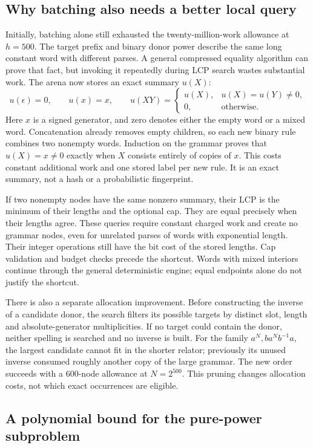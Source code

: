 \subsection{Why batching also needs a better local query}

Initially, batching alone still exhausted the twenty-million-work allowance
at $h=500$. The target prefix and binary donor power describe the same
long constant word with different parses. A general compressed equality
algorithm can prove that fact, but invoking it repeatedly during LCP search
wastes substantial work. The arena now stores an exact summary $u(X)$:
\[
 u(\epsilon)=0,\qquad u(x)=x,\qquad
 u(XY)=\begin{cases}
 u(X),&u(X)=u(Y)\ne0,\\
 0,&\text{otherwise}.
 \end{cases}
\]
Here $x$ is a signed generator, and zero denotes either the empty word or
a mixed word. Concatenation already removes empty children, so each new
binary rule combines two nonempty words. Induction on the grammar proves
that $u(X)=x\ne0$ exactly when $X$ consists entirely of copies of $x$.
This costs constant additional work and one stored label per new rule.
It is an exact summary, not a hash or a probabilistic fingerprint.

If two nonempty nodes have the same nonzero summary, their LCP is the
minimum of their lengths and the optional cap. They are equal precisely
when their lengths agree. These queries require constant charged work
and create no grammar nodes, even for unrelated parses of words with
exponential length. Their integer operations still have the bit cost of
the stored lengths. Cap validation and budget checks precede the shortcut.
Words with mixed interiors continue through the general deterministic
engine; equal endpoints alone do not justify the shortcut.

There is also a separate allocation improvement. Before constructing the
inverse of a candidate donor, the search filters its possible targets by
distinct slot, length and absolute-generator multiplicities. If no target
could contain the donor, neither spelling is searched and no inverse is
built. For the family $a^N,ba^Nb^{-1}a$, the largest candidate cannot fit
in the shorter relator; previously its unused inverse consumed roughly
another copy of the large grammar. The new order succeeds with a
600-node allowance at $N=2^{500}$. This pruning changes allocation costs,
not which exact occurrences are eligible.

\subsection{A polynomial bound for the pure-power subproblem}

